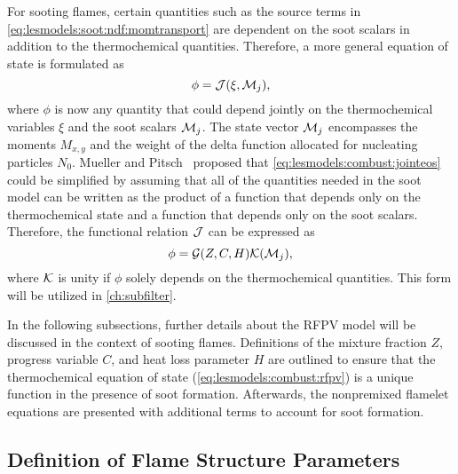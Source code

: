 For sooting flames, certain quantities such as the source terms in \cref{eq:lesmodels:soot:ndf:momtransport} are dependent on the soot scalars in addition to the thermochemical quantities. Therefore, a more general equation of state is formulated as~\cite{mueller2012}
\begin{equation}\label{eq:lesmodels:combust:jointeos}
  \phi = \mathcal{J}(\xi, \mathcal{M}_j),
\end{equation}
where $\phi$ is now any quantity that could depend jointly on the thermochemical variables $\xi$ and the soot scalars $\mathcal{M}_j$. The state vector $\mathcal{M}_j$ encompasses the moments $M_{x,y}$ and the weight of the delta function allocated for nucleating particles $N_0$. Mueller and Pitsch~\cite{subfilterpdf2011} proposed that \cref{eq:lesmodels:combust:jointeos} could be simplified by assuming that all of the quantities needed in the soot model can be written as the product of a function that depends only on the thermochemical state and a function that depends only on the soot scalars. Therefore, the functional relation $\mathcal{J}$ can be expressed as~\cite{mueller2012}
\begin{equation}\label{eq:lesmodels:combust:producteos}
  \phi = \mathcal{G}(Z, C, H)\mathcal{K}(\mathcal{M}_j),
\end{equation}
where $\mathcal{K}$ is unity if $\phi$ solely depends on the thermochemical quantities. This form will be utilized in \cref{ch:subfilter}.


In the following subsections, further details about the RFPV model will be discussed in the context of sooting flames. Definitions of the mixture fraction $Z$, progress variable $C$, and heat loss parameter $H$ are outlined to ensure that the thermochemical equation of state (\cref{eq:lesmodels:combust:rfpv}) is a unique function in the presence of soot formation. Afterwards, the nonpremixed flamelet equations are presented with additional terms to account for soot formation.


\subsection{Definition of Flame Structure Parameters}
\label{sec:lesmodels:combust:map}

